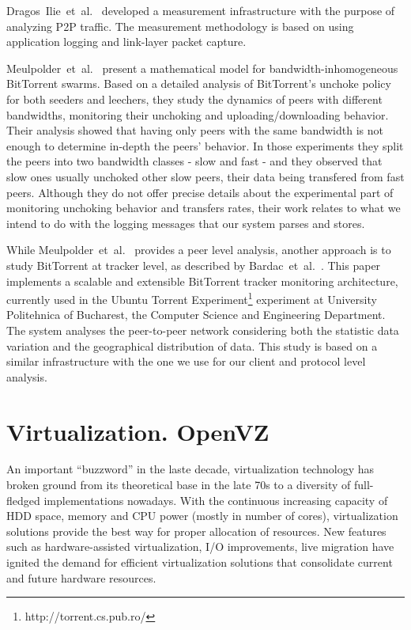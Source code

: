 Dragos~Ilie~et~al.~\cite{p2p-traf-meas} developed a measurement infrastructure
with the purpose of analyzing P2P traffic. The measurement methodology is
based on using application logging and link-layer packet capture.

Meulpolder~et~al.~\cite{p2p09} present a mathematical model for
bandwidth-inhomogeneous BitTorrent swarms. Based on a detailed analysis of
BitTorrent's unchoke policy for both seeders and leechers, they study the
dynamics of peers with different bandwidths, monitoring their unchoking and
uploading/downloading behavior. Their analysis showed that having only peers
with the same bandwidth is not enough to determine in-depth the peers'
behavior. In those experiments they split the peers into two bandwidth classes
- slow and fast - and they observed that slow ones usually unchoked other slow
peers, their data being transfered from fast peers. Although they do not offer
precise details about the experimental part of monitoring unchoking behavior
and transfers rates, their work relates to what we intend to do with the
logging messages that our system parses and stores. 

While Meulpolder~et~al.~\cite{p2p09} provides a peer level analysis, another
approach is to study BitTorrent at tracker level, as described by
Bardac~et~al.~\cite{tracker-mon}.  This paper implements a scalable and
extensible BitTorrent tracker monitoring architecture, currently used in the
Ubuntu Torrent Experiment\footnote{http://torrent.cs.pub.ro/} experiment at
University Politehnica of Bucharest, the Computer Science and Engineering
Department. The system analyses the peer-to-peer network considering both the
statistic data variation and the geographical distribution of data. This study
is based on a similar infrastructure with the one we use for our client and
protocol level analysis.

\section{Virtualization. OpenVZ}
\label{sec:virt-infra:openvz}

An important ``buzzword'' in the laste decade, virtualization technology has
broken ground from its theoretical base in the late 70s to a diversity of
full-fledged implementations nowadays. With the continuous increasing capacity
of HDD space, memory and CPU power (mostly in number of cores), virtualization
solutions provide the best way for proper allocation of resources. New
features such as hardware-assisted virtualization, I/O improvements, live
migration have ignited the demand for efficient virtualization solutions that
consolidate current and future hardware resources.

